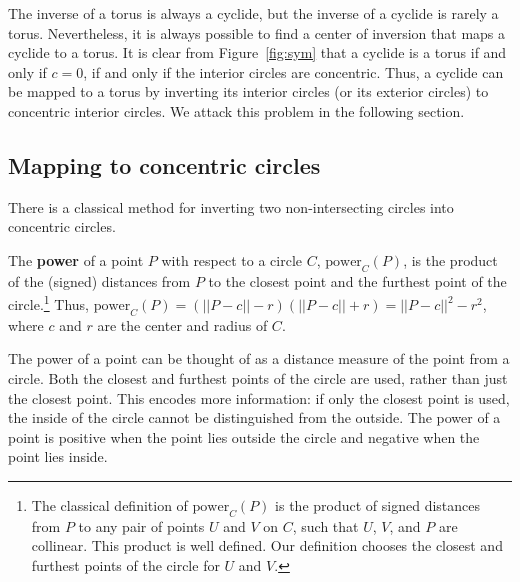 The inverse of a torus is always a cyclide, but the inverse of a cyclide
is rarely a torus.
Nevertheless, it is always possible to find a center of inversion that maps
a cyclide to a torus.
It is clear from Figure~\ref{fig:sym} that a cyclide is a torus if and only
if $c=0$, if and only if the interior circles are concentric.
Thus, a cyclide can be mapped to a torus by
inverting its interior circles (or its exterior circles) 
to concentric interior circles.
We attack this problem in the following section.


\subsection{Mapping to concentric circles}

There is a classical method for inverting two non-intersecting circles 
into concentric circles.

\begin{defn2}
\label{defn:power}
The {\bf power} of a point $P$ with respect to a circle $C$,
$\mbox{power}_{C}(P)$, is the product of the (signed) distances from
$P$ to the closest point and the furthest point 
of the circle.\footnote{The classical
	definition of $\mbox{power}_{C}(P)$ is  
	the product of signed distances from $P$ 
	to any pair of points $U$ and $V$
	on $C$, such that $U$, $V$, and $P$ are collinear.
	This product is well defined.
	Our definition chooses the closest and furthest points of the
	circle for $U$ and $V$.}
Thus, $\mbox{power}_{C}(P) = (||P-c|| - r)(||P-c|| + r)
= ||P-c||^2 - r^2$, where $c$ and $r$ are the 
center and radius of $C$.
\end{defn2}


\begin{rmk}
\label{rmk:pow}
The power of a point can be thought of as a distance measure of the point
from a circle. 
Both the closest and furthest points of the circle are used, 
rather than just the closest point.
This encodes more information: if only the closest point is used, 
the inside of the circle cannot be distinguished from the outside.
The power of a point is positive when the point lies outside the 
circle and negative when the point lies inside.


\end{rmk}

